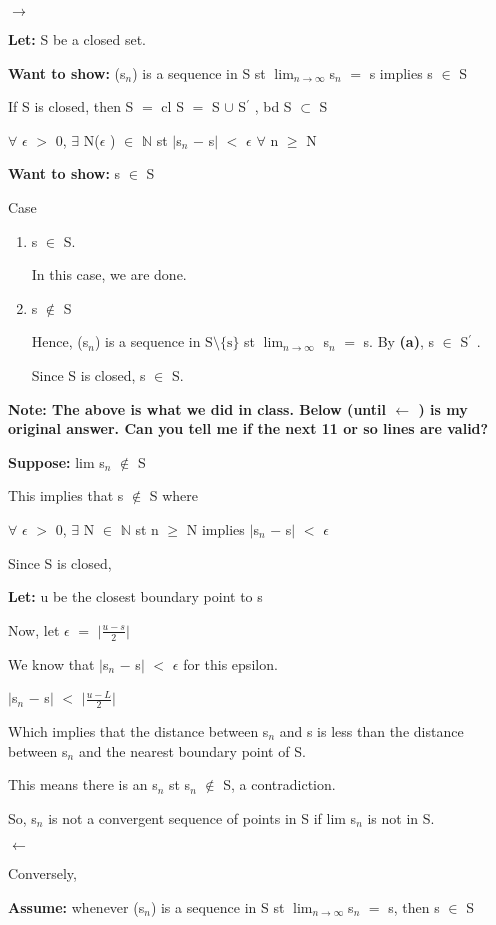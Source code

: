 \documentclass{article}
\newcommand{\mt}[1]{\ensuremath{#1}}
\newcommand{\elist}{\end{enumerate}}
\newcommand{\bilist}{\begin{enumerate}[label=\roman*)]}
\newcommand{\lt}[1]{\textbf{Let: } #1}
\newcommand{\supp}[1]{\textbf{Suppose: } #1}
\newcommand{\wts}[1]{\textbf{Want to show: } #1}
\newcommand{\as}[1]{\textbf{Assume: } #1}
\newcommand{\bpth}[1]{\textbf{(#1)}}
\newcommand{\bn}{\mt{\mathbb{N}} }       %
\newcommand{\ep}{\mt{\epsilon} }         %
\newcommand{\fa}{\mt{\forall} }          %
\newcommand{\mem}{\mt{\in} }
\newcommand{\exs}{\mt{\exists} }
\newcommand{\sbs}{\mt{\subset} }         %
\newcommand{\lra}{ \mt{\longrightarrow} } %
\newcommand{\lla}{ \mt{\longleftarrow} }  %
\newcommand{\av}[1]{\mt{|}#1\mt{|}}  %
\newcommand{\prn}[1]{(#1)}
\newcommand{\bk}[1]{\{#1\}}
\newcommand{\ms}{\mt{-} }
\newcommand{\ls}{\mt{<} }
\newcommand{\gr}{\mt{>} }
\newcommand{\gre}{\mt{\geq} }
\newcommand{\eql}{\mt{=} }
\newcommand{\pr}{\mt{^\prime} } 		   %
\newcommand{\uw}[2]{#1\mt{_{#2}}}
\newcommand{\frc}[2]{\mt{\frac{#1}{#2}}}
\newcommand{\lmti}[1]{\mt{\displaystyle{\lim_{#1 \to \infty}}}}
\newcommand{\bnt}[2]{\mt{\textrm{#1}\setminus{\textrm{#2}}}}
\begin{document}
{	\lra 
	
	\lt{S be a closed set.}
	
	\wts{\prn{\uw{s}{n}} is a sequence in S st \lmti{n}\uw{s}{n} \eql s implies s \mem S}
	
	If S is closed, then S \eql cl S \eql S $\cup$ S\pr, bd S \sbs S
	
	\fa \ep \gr 0, \exs N(\ep) \mem \bn st \av{\uw{s}{n} \ms s} \ls \ep \fa n \gre N
	
	\wts{s \mem S}
	
	Case
	
	\bilist
	\item s \mem S.
		
		In this case, we are done.
	\item s $\not\in$ S
		
		Hence, \prn{\uw{s}{n}} is a sequence in \bnt{S}{\bk{s}}  st \lmti{n} \uw{s}{n} \eql s. By \bpth{a}, s \mem S\pr. 
		
		Since S is closed, s \mem S.
	\elist
	
	\textbf{Note: The above is what we did in class. Below (until \lla) is my original answer. Can you tell me if the next 11 or so lines are valid?}
	
	\supp{lim \uw{s}{n} $\not\in$ S}
	
	This implies that s $\not\in$ S where
	
	\fa \ep \gr 0, \exs N \mem \bn st n \gre N implies \av{\uw{s}{n} \ms s} \ls \ep
	
	Since S is closed,
	
	\lt{u be the closest boundary point to s}
	
	Now, let \ep \eql \av{\frc{u \ms s}{2}}
	
	We know that \av{\uw{s}{n} \ms s} \ls \ep for this epsilon.
	
	\av{\uw{s}{n} \ms s} \ls \av{\frc{u \ms L}{2}}
	
	Which implies that the distance between \uw{s}{n} and s is less than the distance between \uw{s}{n} and the nearest boundary point of S.
	
	This means there is an \uw{s}{n} st \uw{s}{n} $\not\in$ S, a contradiction.
	
	So, \uw{s}{n} is not a convergent sequence of points in S if lim \uw{s}{n} is not in S. 
	
	\lla
	
	Conversely, 
	
	\as{whenever \prn{\uw{s}{n}} is a sequence in S st \lmti{n}\uw{s}{n} \eql s, then s \mem S}
	
}
\end{document}
